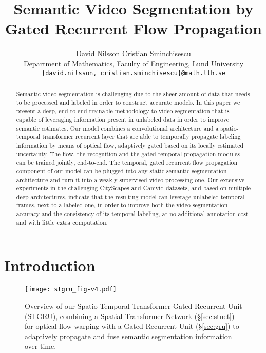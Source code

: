\documentclass[10pt,twocolumn,letterpaper]{article}
\begin{document}
\title{Semantic Video Segmentation by Gated Recurrent Flow Propagation}

\author{David Nilsson \qquad  Cristian Sminchisescu\\
Department of Mathematics, Faculty of Engineering, Lund University\\
{\tt\small \{david.nilsson, cristian.sminchisescu\}@math.lth.se}
}

\maketitle





\begin{abstract}

Semantic video segmentation is challenging due to the sheer amount of data that needs to be processed and labeled in order to construct accurate models. In this paper we present a deep, end-to-end trainable methodology to video segmentation that is capable of leveraging information present in unlabeled data in order to improve semantic estimates. Our model combines a convolutional architecture and a spatio-temporal transformer recurrent layer that are able to temporally propagate labeling information by means of optical flow, adaptively gated based on its locally estimated uncertainty. The flow, the recognition and the gated temporal propagation modules can be trained jointly, end-to-end. The temporal, gated recurrent flow propagation component of our model can be plugged into any static semantic segmentation architecture and turn it into a weakly supervised video processing one. Our extensive experiments in the challenging CityScapes and Camvid datasets, and based on multiple deep architectures, indicate that the resulting model can leverage unlabeled temporal frames, next to a labeled one, in order to improve both the video segmentation accuracy and the consistency of its temporal labeling, at no additional annotation cost and with little extra computation. 
\end{abstract}



\section{Introduction}



\begin{figure*}
\centering
\texttt{[image: stgru\_fig-v4.pdf]}
\caption{Overview of our Spatio-Temporal Transformer Gated Recurrent Unit (STGRU), combining a Spatial Transformer Network (\S\ref{sec:stnet}) for optical flow warping with a Gated Recurrent Unit (\S\ref{sec:gru}) to adaptively propagate and fuse semantic segmentation information over time.}
\label{Network_architecture}
\end{figure*}
\end{document}
